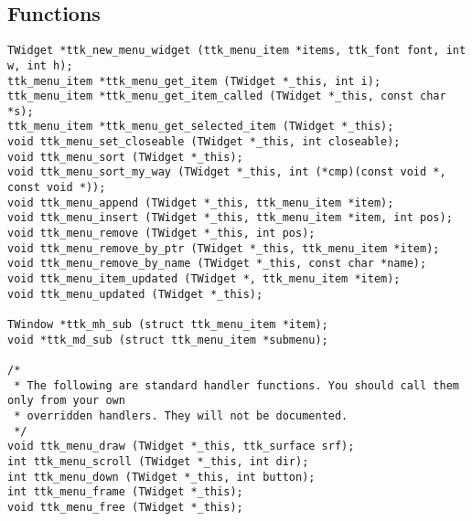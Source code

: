 \documentclass[12pt,letterpaper]{report}
\begin{document}
\subsection{Functions}
{\footnotesize\begin{verbatim}
TWidget *ttk_new_menu_widget (ttk_menu_item *items, ttk_font font, int w, int h);
ttk_menu_item *ttk_menu_get_item (TWidget *_this, int i);
ttk_menu_item *ttk_menu_get_item_called (TWidget *_this, const char *s);
ttk_menu_item *ttk_menu_get_selected_item (TWidget *_this);
void ttk_menu_set_closeable (TWidget *_this, int closeable);
void ttk_menu_sort (TWidget *_this);
void ttk_menu_sort_my_way (TWidget *_this, int (*cmp)(const void *, const void *));
void ttk_menu_append (TWidget *_this, ttk_menu_item *item);
void ttk_menu_insert (TWidget *_this, ttk_menu_item *item, int pos);
void ttk_menu_remove (TWidget *_this, int pos);
void ttk_menu_remove_by_ptr (TWidget *_this, ttk_menu_item *item);
void ttk_menu_remove_by_name (TWidget *_this, const char *name);
void ttk_menu_item_updated (TWidget *, ttk_menu_item *item);
void ttk_menu_updated (TWidget *_this);

TWindow *ttk_mh_sub (struct ttk_menu_item *item);
void *ttk_md_sub (struct ttk_menu_item *submenu);

/*
 * The following are standard handler functions. You should call them only from your own
 * overridden handlers. They will not be documented.
 */
void ttk_menu_draw (TWidget *_this, ttk_surface srf);
int ttk_menu_scroll (TWidget *_this, int dir);
int ttk_menu_down (TWidget *_this, int button);
int ttk_menu_frame (TWidget *_this);
void ttk_menu_free (TWidget *_this);
\end{verbatim}
}
\end{document}
